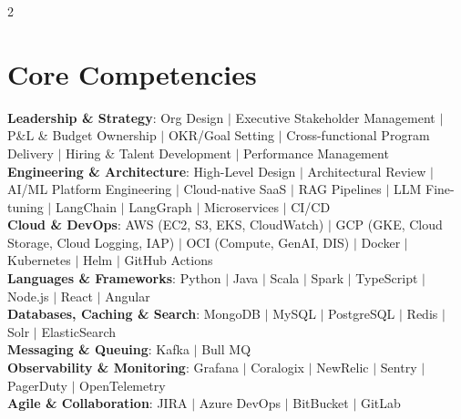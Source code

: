 \documentclass[letterpaper, 10pt]{article}
\begin{document}
\setlength{\columnsep}{0.35in}
\begin{paracol}{2}


\section{Core Competencies}
\begin{itemize}[leftmargin=0.1in, label={}]
  \small{\item{
    \textbf{Leadership \& Strategy}{: Org Design $|$ Executive Stakeholder Management $|$ P\&L \& Budget Ownership $|$ OKR/Goal Setting $|$ Cross-functional Program Delivery $|$ Hiring \& Talent Development $|$ Performance Management} \\
    \vspace{3pt}
    \textbf{Engineering \& Architecture}{: High-Level Design $|$ Architectural Review $|$ AI/ML Platform Engineering $|$ Cloud-native SaaS $|$ RAG Pipelines $|$ LLM Fine-tuning $|$ LangChain $|$ LangGraph $|$ Microservices $|$ CI/CD} \\
    \vspace{3pt}
    \textbf{Cloud \& DevOps}{: AWS (EC2, S3, EKS, CloudWatch) $|$ GCP (GKE, Cloud Storage, Cloud Logging, IAP) $|$ OCI (Compute, GenAI, DIS) $|$ Docker $|$ Kubernetes $|$ Helm $|$ GitHub Actions} \\
    \vspace{3pt}
    \textbf{Languages \& Frameworks}{: Python $|$ Java $|$ Scala $|$ Spark $|$ TypeScript $|$ Node.js $|$ React $|$ Angular} \\
    \vspace{3pt}
    \textbf{Databases, Caching \& Search}{: MongoDB $|$ MySQL $|$ PostgreSQL $|$ Redis $|$ Solr $|$ ElasticSearch} \\
    \vspace{3pt}
    \textbf{Messaging \& Queuing}{: Kafka $|$ Bull MQ} \\
    \vspace{3pt}
    \textbf{Observability \& Monitoring}{: Grafana $|$ Coralogix $|$ NewRelic $|$ Sentry $|$ PagerDuty $|$ OpenTelemetry} \\
    \vspace{3pt}
    \textbf{Agile \& Collaboration}{: JIRA $|$ Azure DevOps $|$ BitBucket $|$ GitLab} \\
    \vspace{3pt}
  }}
\end{itemize}


\end{paracol}
\end{document}
